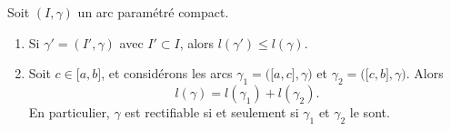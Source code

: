 \begin{proposition}     \label{Propletautredecop}
    Soit $(I,\gamma)$ un arc paramétré compact.
    \begin{enumerate}
        \item
            Si $\gamma'=(I',\gamma)$ avec $I'\subset I$, alors $l(\gamma')\leq l(\gamma)$.
        \item
            Soit $c\in\mathopen[ a , b \mathclose]$, et considérons les arcs $\gamma_1=\big( \mathopen[ a , c \mathclose],\gamma \big)$ et $\gamma_2=\big( \mathopen[ c , b \mathclose],\gamma \big)$. Alors 
            \begin{equation}
                l(\gamma)=l(\gamma_1)+l(\gamma_2).
            \end{equation}
            En particulier, $\gamma$ est rectifiable si et seulement si $\gamma_1$ et $\gamma_2$ le sont.
    \end{enumerate}
\end{proposition}

